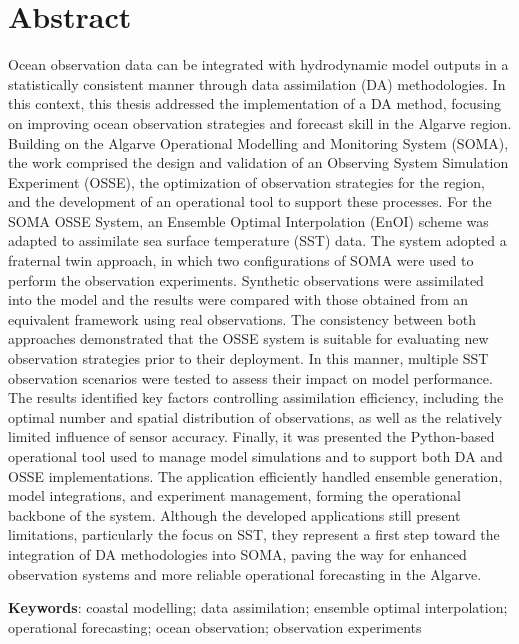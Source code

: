 \documentclass{auxfiles/ualgphdcls}
\begin{document}
\chapter*{Abstract}
Ocean observation data can be integrated with hydrodynamic model outputs in a statistically consistent manner through data assimilation (DA) methodologies. In this context, this thesis addressed the implementation of a DA method, focusing on improving ocean observation strategies and forecast skill in the Algarve region. Building on the Algarve Operational Modelling and Monitoring System (SOMA), the work comprised the design and validation of an Observing System Simulation Experiment (OSSE), the optimization of observation strategies for the region, and the development of an operational tool to support these processes. For the SOMA OSSE System, an Ensemble Optimal Interpolation (EnOI) scheme was adapted to assimilate sea surface temperature (SST) data. The system adopted a fraternal twin approach, in which two configurations of SOMA were used to perform the observation experiments. Synthetic observations were assimilated into the model and the results were compared with those obtained from an equivalent framework using real observations. The consistency between both approaches demonstrated that the OSSE system is suitable for evaluating new observation strategies prior to their deployment. In this manner, multiple SST observation scenarios were tested to assess their impact on model performance. The results identified key factors controlling assimilation efficiency, including the optimal number and spatial distribution of observations, as well as the relatively limited influence of sensor accuracy. Finally, it was presented the Python-based operational tool used to manage model simulations and to support both DA and OSSE implementations. The application efficiently handled ensemble generation, model integrations, and experiment management, forming the operational backbone of the system. Although the developed applications still present limitations, particularly the focus on SST, they represent a first step toward the integration of DA methodologies into SOMA, paving the way for enhanced observation systems and more reliable operational forecasting in the Algarve.

\vspace*{\fill}
\noindent\textbf{Keywords}: coastal modelling; data assimilation; ensemble optimal interpolation; operational forecasting; ocean observation; observation experiments
\newpage

\end{document}
